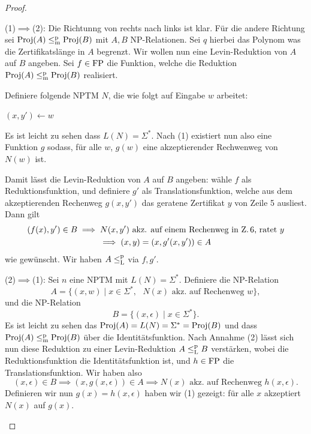 \begin{proof}
    \begin{prooflist}[label={}]
\item (1)$\implies$(2): Die Richtunng von rechts nach links ist klar. Für die andere Richtung sei $\operatorname{Proj}(A) \leq_\mathrm{m}^\mathrm{p} \operatorname{Proj}(B)$ mit $A,B$ NP-Relationen. Sei $q$ hierbei das Polynom was die Zertifikatslänge in $A$ begrenzt.
    Wir wollen nun eine Levin-Reduktion von $A$ auf $B$ angeben. Sei $f\in \mathrm{FP}$ die Funktion, welche die Reduktion $\operatorname{Proj}(A) \leq_\mathrm{m}^\mathrm{p} \operatorname{Proj}(B)$ realisiert.

    Definiere folgende NPTM $N$, die wie folgt auf Eingabe $w$ arbeitet: \\
    \begin{algorithm}[H]
        $(x, y')\gets w$\;
    \end{algorithm}
    Es ist leicht zu sehen dass $L(N)=\Sigma^*$. Nach (1) existiert nun also eine Funktion $g$ sodass, für alle $w$, $g(w)$ eine akzeptierender Rechwenweg von $N(w)$ ist.

    Damit lässt die Levin-Reduktion von $A$ auf $B$ angeben: wähle $f$ als Reduktionsfunktion, und definiere $g'$ als Translationsfunktion, welche aus dem akzeptierenden Rechenweg $g(x, y')$ das geratene Zertifikat $y$ von Zeile 5 ausliest. Dann gilt
    \begin{gather*}
        (f(x), y') \in B \implies N(x, y') \text{ akz. auf einem Rechenweg in Z.\,6, ratet $y$}\\
        \implies (x,y)=(x, g'(x, y'))\in A
    \end{gather*}
    wie gewünscht. Wir haben $A\leq_\mathrm{L}^\mathrm{p}$ via $f, g'$.
\item (2)$\implies$(1): Sei $n$ eine NPTM mit $L(N)=\Sigma^*$.
    Definiere die NP-Relation
    \[ A = \{ (x, w) \mid x\in\Sigma^*,\text{ $N(x)$ akz. auf Rechenweg $w$} \}, \]
    und die NP-Relation
    \[ B = \{ (x, \epsilon) \mid x\in\Sigma^* \}. \]
    Es ist leicht zu sehen das $\operatorname{Proj}(A)=L(N)=\Sigma^*=\operatorname{Proj}(B)$ und dass $\operatorname{Proj}(A)\leq_\mathrm{m}^\mathrm{p}\operatorname{Proj}(B)$ über die Identitätsfunktion.
    Nach Annahme (2) lässt sich nun diese Reduktion zu einer Levin-Reduktion $A\leq_\mathrm{L}^\mathrm{p} B$ verstärken, wobei die Reduktionsfunktion die Identitätsfunktion ist, und $h\in\mathrm{FP}$ die Translationsfunktion.
    Wir haben also
    \[ (x,\epsilon)\in B \implies (x, g(x, \epsilon))\in A \implies \text{$N(x)$ akz. auf Rechenweg $h(x,\epsilon)$}. \]
    Definieren wir nun $g(x)=h(x,\epsilon)$ haben wir (1) gezeigt: für alle $x$ akzeptiert $N(x)$ auf $g(x)$.
\end{prooflist}
\end{proof}

